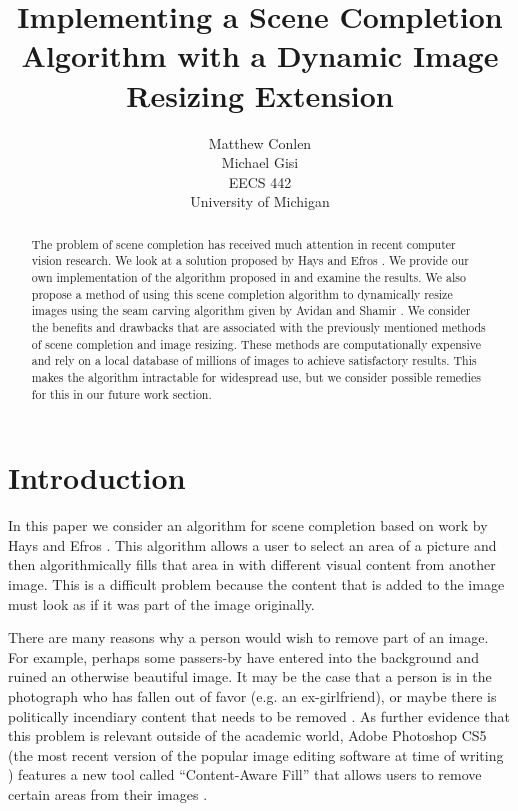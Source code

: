 \documentclass[11pt]{amsart}
\title[Scene Completion and Image Resizing]{Implementing a Scene Completion Algorithm with a Dynamic Image Resizing Extension}
\author{Matthew Conlen \\ Michael Gisi  \\ EECS 442 \\ University of Michigan}
\date{}                                           %
\begin{document}
\maketitle

\begin{abstract}
The problem of scene completion has received much attention in recent computer vision research. We 
look at a solution proposed by Hays and Efros \cite{Hays:2007}. We provide our own implementation of the
algorithm proposed in \cite{Hays:2007} and examine the results. We also propose a method of using this 
scene completion algorithm to dynamically resize images using the seam carving algorithm
given by Avidan and Shamir \cite{Avidan:2007}. We consider the benefits and drawbacks that are associated with the previously mentioned methods of scene completion and image resizing. These methods are computationally expensive and rely on a local database of millions of images to achieve satisfactory results. This makes the algorithm intractable for widespread use, but we consider possible remedies for this in our future work section. 
 
\end{abstract}

\section{Introduction}

In this paper we consider an algorithm for scene completion based on work by Hays and Efros \cite{Hays:2007}. This algorithm allows a user to select an area of a picture and then algorithmically fills that area in with different visual content from another image. This is a difficult problem because the content that is added to the image must look as if it was part of the image originally. 

There are many reasons why a person would wish to remove part of an image. For example, perhaps some passers-by have entered into the background and ruined an otherwise beautiful image. It may be the case that a person is in the photograph who has fallen out of favor (e.g. an ex-girlfriend), or maybe there is politically incendiary content that needs to be removed \cite{King:1997}. As further evidence that this problem is relevant outside of the academic world, Adobe Photoshop CS5 (the most recent version of the popular image editing software at time of writing ) features a new tool called ``Content-Aware Fill'' that allows users to remove certain areas from their images \cite{Barnes:2009}. 
\end{document}
